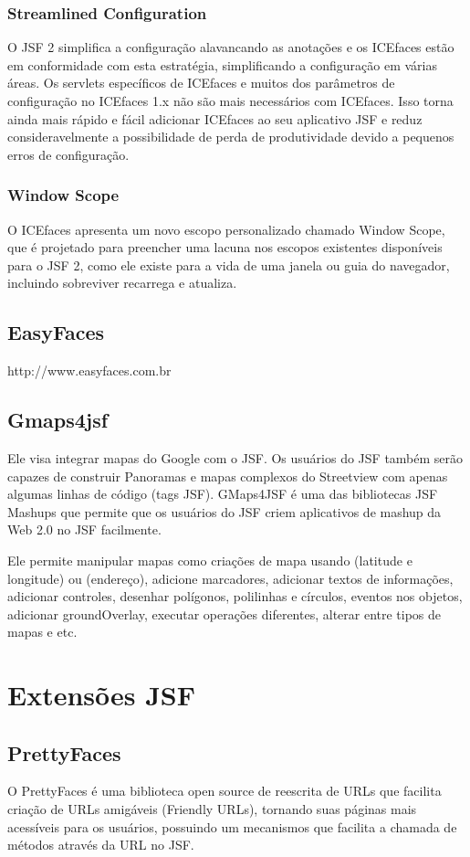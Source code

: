 \documentclass[12pt,a4paper]{article}
\begin{document}
\subsubsection{Streamlined Configuration}
O JSF 2 simplifica a configuração alavancando as anotações e os ICEfaces estão em conformidade com esta estratégia, simplificando a configuração em várias áreas. Os servlets específicos de ICEfaces e muitos dos parâmetros de configuração no ICEfaces 1.x não são mais necessários com ICEfaces. Isso torna ainda mais rápido e fácil adicionar ICEfaces ao seu aplicativo JSF e reduz consideravelmente a possibilidade de perda de produtividade devido a pequenos erros de configuração.

\subsubsection{Window Scope}
O ICEfaces apresenta um novo escopo personalizado chamado Window Scope, que é projetado para preencher uma lacuna nos escopos existentes disponíveis para o JSF 2, como ele existe para a vida de uma janela ou guia do navegador, incluindo sobreviver recarrega e atualiza.

\subsection{EasyFaces}
http://www.easyfaces.com.br 

\subsection{Gmaps4jsf}
Ele visa integrar mapas do Google com o JSF. Os usuários do JSF também serão capazes de construir Panoramas e mapas complexos do Streetview com apenas algumas linhas de código (tags JSF). GMaps4JSF é uma das bibliotecas JSF Mashups que permite que os usuários do JSF criem aplicativos de mashup da Web 2.0 no JSF facilmente.

Ele permite manipular mapas como criações de mapa usando (latitude e longitude) ou (endereço), adicione marcadores, adicionar textos de informações, adicionar controles, desenhar polígonos, polilinhas e círculos, eventos nos objetos, adicionar groundOverlay, executar operações diferentes, alterar entre tipos de mapas e etc.

\section{Extensões JSF}
\subsection{PrettyFaces}
O PrettyFaces é uma biblioteca open source de reescrita de URLs que facilita criação de URLs amigáveis (Friendly URLs), tornando suas páginas mais acessíveis para os usuários, possuindo um mecanismos que facilita a chamada de métodos através da URL no JSF.
\end{document}
